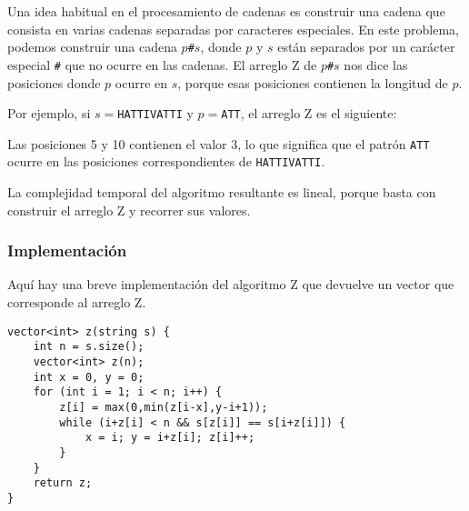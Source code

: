 Una idea habitual en el procesamiento de cadenas es
construir una cadena que consista en
varias cadenas separadas por caracteres especiales.
En este problema, podemos construir una cadena
$p$\texttt{\#}$s$,
donde $p$ y $s$ están separados por un carácter especial
\texttt{\#} que no ocurre
en las cadenas.
El arreglo Z de $p$\texttt{\#}$s$ nos dice las posiciones
donde $p$ ocurre en $s$,
porque esas posiciones contienen la longitud de $p$.

Por ejemplo, si $s=$\texttt{HATTIVATTI} y $p=$\texttt{ATT},
el arreglo Z es el siguiente:

\begin{center}
\end{center}

Las posiciones 5 y 10 contienen el valor 3,
lo que significa que el patrón \texttt{ATT}
ocurre en las posiciones correspondientes
de \texttt{HATTIVATTI}.

La complejidad temporal del algoritmo resultante
es lineal, porque basta con construir
el arreglo Z y recorrer sus valores.

\subsubsection{Implementación}

Aquí hay una breve implementación del algoritmo Z
que devuelve un vector que corresponde al arreglo Z.

\begin{lstlisting}
vector<int> z(string s) {
    int n = s.size();
    vector<int> z(n);
    int x = 0, y = 0;
    for (int i = 1; i < n; i++) {
        z[i] = max(0,min(z[i-x],y-i+1));
        while (i+z[i] < n && s[z[i]] == s[i+z[i]]) {
            x = i; y = i+z[i]; z[i]++;
        }
    }
    return z;
}
\end{lstlisting}

